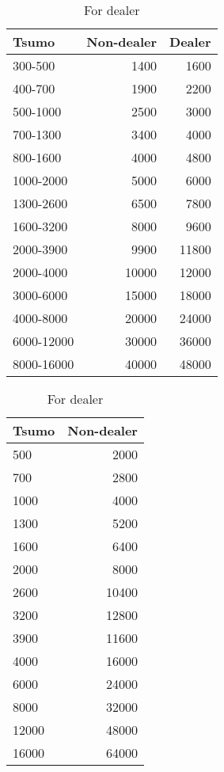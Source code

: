 {\begin{table}[h!]
\centering\captionsetup{font=small}\small
\begin{minipage}[h]{0.49\hsize}
\caption{For non-dealer} \label{tbl:pd5}
\begin{tabular}{l r r}
\toprule
{ Tsumo} & {\footnotesize Non-dealer} & {\footnotesize Dealer}\\
\midrule
300-500 &	1400	& 1600\\
400-700 &	1900	&2200\\
500-1000&2500&3000\\
700-1300&3400&4000\\
800-1600&4000&4800\\
1000-2000&5000&6000\\
1300-2600&6500&7800\\
1600-3200&8000&9600\\
2000-3900&9900&11800\\
2000-4000&10000&12000\\
3000-6000&15000&18000\\
4000-8000&20000&24000\\
6000-12000&30000&36000\\
8000-16000&40000&48000\\
\bottomrule
\end{tabular}
\end{minipage}
    \hfill
\begin{minipage}[h]{0.49\hsize}\centering
\caption{For dealer} \label{tbl:pd6}
\begin{tabular}{l r}
\toprule
{Tsumo} & {\footnotesize Non-dealer} \\
\midrule
500&	2000\\
700&	2800\\
1000&4000\\
1300&5200\\
1600&6400\\
2000&8000\\
2600&10400\\
3200&12800\\
3900&11600\\
4000&16000\\
6000&24000\\
8000&32000\\
12000&48000\\
16000&64000\\
\bottomrule
\end{tabular}
\end{minipage}
\end{table}}

